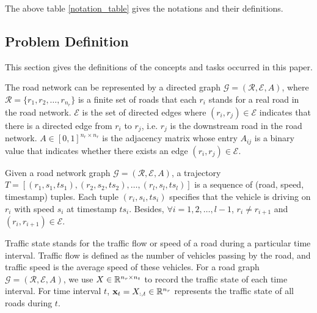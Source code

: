 \begin{table}[htb]
\begin{center}
\begin{tabular}{cl}
            \bottomrule
        \end{tabular}
    \end{center}
\end{table}
The above table \ref{notation_table} gives the notations and their definitions.

\subsection{Problem Definition}
This section gives the definitions\cite{AAAI21} of the concepts and tasks occurred in this paper.
\begin{definition}
    The road network can be represented by a directed graph $\mathcal{G}=(\mathcal{R}, \mathcal{E}, A)$, where $\mathcal{R}=\{r_1, r_2, \dots, r_{n_r}\}$ is a finite set of roads that each $r_i$ stands for a real road in the road network. $\mathcal{E}$ is the set of directed edges where $(r_i, r_j)\in \mathcal{E}$ indicates that there is a directed edge from $r_i$ to $r_j$, i.e. $r_j$ is the downstream road in the road network. $A \in [0, 1]^{n_r\times n_r}$ is the adjacency matrix whose entry $A_{ij}$ is a binary value that indicates whether there exists an edge $(r_i, r_j)\in\mathcal{E}$.
\end{definition}

\begin{definition}[Trajectory]
    Given a road network graph $\mathcal{G}=(\mathcal{R}, \mathcal{E}, A)$, a trajectory $T=[(r_1, s_1, ts_1), (r_2, s_2, ts_2), \dots, (r_l, s_l, ts_l)]$ is a sequence of (road, speed, timestamp) tuples. Each tuple $(r_i, s_i, ts_i)$ specifies that the vehicle is driving on $r_i$ with speed $s_i$ at timestamp $ts_i$. Besides, $\forall i=1, 2, \dots, l-1$, $r_i\neq r_{i+1}$ and $(r_i, r_{i+1})\in\mathcal{E}$.
\end{definition}

\begin{definition}
    Traffic state stands for the traffic flow or speed of a road during a particular time interval. Traffic flow is defined as the number of vehicles passing by the road, and traffic speed is the average speed of these vehicles. For a road graph $\mathcal{G}=(\mathcal{R}, \mathcal{E}, A)$, we use $X\in\mathbb{R}^{n_r\times n_t}$ to record the traffic state of each time interval. For time interval $t$, $\mathbf{x}_t=X_{:, t}\in\mathbb{R}^{n_r}$ represents the traffic state of all roads during $t$.
\end{definition}

